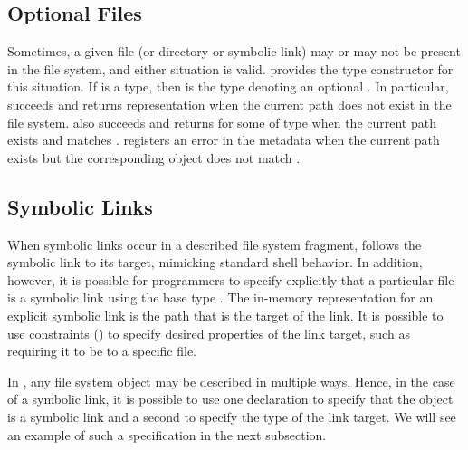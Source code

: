 \subsection{Optional Files}
\label{sec:maybe}
Sometimes, a given file (or directory or symbolic link) may or may not
be present in the file system, and either situation is valid.
\forest{} provides the  type constructor for this
situation.  If  is a \forest{} type, then  is the
\forest{} type denoting an optional .  In particular, 
 succeeds and returns representation  when the
current path does not exist in the file system.   also
succeeds and returns  for some  of type  
when the current path exists and matches .  
registers an error in the metadata when the current path exists but
the corresponding object does not match . 

\subsection{Symbolic Links}
\label{sec:symlinks}
When symbolic links occur in a described file system fragment,
\forest{} follows the symbolic link to its target, mimicking 
standard shell behavior.    In addition, however, it is possible
for programmers to specify explicitly that a particular file is a
symbolic link using the base type .  The in-memory
representation for an explicit symbolic link is the path that is the
target of the link.  It is possible to use constraints
() to specify desired properties of the link
target, such as requiring it to be to a specific file.

In \forest{}, any file system object may be described in multiple ways.
Hence, in the case of a symbolic link, it is possible to use one declaration to
specify that the object is a symbolic link and a second to specify
the type of the link target.  We will see an example of such a specification in the
next subsection. 

